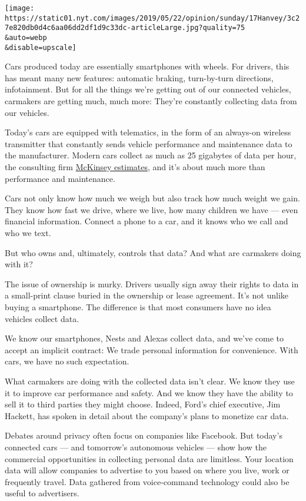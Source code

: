 \texttt{[image: https://static01.nyt.com/images/2019/05/22/opinion/sunday/17Hanvey/3c27e820db0d4c6aa06dd2df1d9c33dc-articleLarge.jpg?quality=75\\\&auto=webp\\\&disable=upscale]}

Cars produced today are essentially smartphones with wheels. For
drivers, this has meant many new features: automatic braking,
turn-by-turn directions, infotainment. But for all the things we're
getting out of our connected vehicles, carmakers are getting much, much
more: They're constantly collecting data from our vehicles.

Today's cars are equipped with telematics, in the form of an always-on
wireless transmitter that constantly sends vehicle performance and
maintenance data to the manufacturer. Modern cars collect as much as 25
gigabytes of data per hour, the consulting firm
\href{https://www.mckinsey.com/industries/automotive-and-assembly/our-insights/whats-driving-the-connected-car}{McKinsey
estimates}, and it's about much more than performance and maintenance.

Cars not only know how much we weigh but also track how much weight we
gain. They know how fast we drive, where we live, how many children we
have --- even financial information. Connect a phone to a car, and it
knows who we call and who we text.

But who owns and, ultimately, controls that data? And what are carmakers
doing with it?

The issue of ownership is murky. Drivers usually sign away their rights
to data in a small-print clause buried in the ownership or lease
agreement. It's not unlike buying a smartphone. The difference is that
most consumers have no idea vehicles collect data.

We know our smartphones, Nests and Alexas collect data, and we've come
to accept an implicit contract: We trade personal information for
convenience. With cars, we have no such expectation.

What carmakers are doing with the collected data isn't clear. We know
they use it to improve car performance and safety. And we know they have
the ability to sell it to third parties they might choose. Indeed,
Ford's chief executive, Jim Hackett, has spoken in detail about the
company's plans to monetize car data.

Debates around privacy often focus on companies like Facebook. But
today's connected cars --- and tomorrow's autonomous vehicles --- show
how the commercial opportunities in collecting personal data are
limitless. Your location data will allow companies to advertise to you
based on where you live, work or frequently travel. Data gathered from
voice-command technology could also be useful to advertisers.

